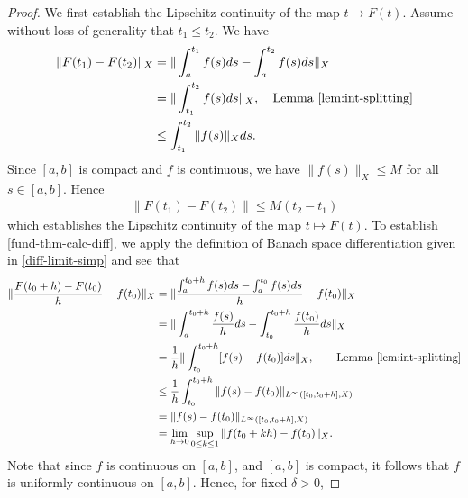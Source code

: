\documentclass[12pt,reqno]{amsart}
\numberwithin{equation}{section}  %
\numberwithin{figure}{section}
\theoremstyle{plain}
\theoremstyle{definition}
\theoremstyle{remark}
\begin{document}
\begin{proof}
We first establish the Lipschitz continuity of the map $t \mapsto F(t)$. Assume without
loss of generality that $t_{1} \le t_{2}$. We have
%
%
\begin{equation*}
\begin{split}
  \| F(t_{1}) - F(t_{2}) \|_{X}
  & = \| \int_{a}^{t_{1}}f(s)ds -
  \int_{a}^{t_{2}} f(s)ds \|_{X}
  \\
  & = \| \int_{t_{1}}^{t_{2}} f(s) ds \|_{X}, \quad \text{Lemma
  \ref{lem:int-splitting}}
  \\
  & \le \int_{t_{1}}^{t_{2}}\| f(s) \|_{X} ds.
\end{split}
\end{equation*}
%
%
Since $[a,b]$ is compact and $f$ is continuous, we have $\| f(s) \|_{X} \le M$
for all $s \in [a,b]$. Hence
%
%
\begin{equation*}
\begin{split}
  \| F(t_{1}) - F(t_{2}) \| \le M(t_{2} - t_{1})
\end{split}
\end{equation*}
%
%
which establishes the Lipschitz continuity of the map $t \mapsto F(t)$. To
establish \eqref{fund-thm-calc-diff}, we apply the definition of Banach space
differentiation given in \eqref{diff-limit-simp} and see that
%
%
\begin{equation*}
\begin{split}
   \| \frac{F(t_{0} + h) - F(t_{0})}{h}  - f(t_{0}) \|_{X}
  & = \| \frac{\int_{a}^{t_{0}+h}f(s)ds - \int_{a}^{t_{0}}f(s)ds}{h} -
  f(t_{0}) \|_{X}
  \\
  & = \| \int_{a}^{t_{0}+h}\frac{f(s)}{h}ds  -
  \int_{t_{0}}^{t_{0} + h} \frac{f(t_{0})}{h} ds \|_{X}
  \\
  & = \frac{1}{h} \| \int_{t_{0}}^{t_{0} + h}[f(s) - f(t_{0})]ds \|_{X}, \qquad
  \text{Lemma \ref{lem:int-splitting}}
  \\
  & \le \frac{1}{h} \int_{t_{0}}^{t_{0} + h} \| f(s) - f(t_{0})
  \|_{L^{\infty}\left( [t_{0}, t_{0} + h], X \right)}
  \\
  & = \| f(s) - f(t_{0})
  \|_{L^{\infty}\left( [t_{0}, t_{0} + h], X \right)}
  \\
  & = \lim_{h \to 0} \sup_{0 \le k \le 1} \| f(t_{0} + kh) - f(t_{0})
  \|_{X}.
\end{split}
\end{equation*}
%
%
Note that since $f$ is continuous on $[a,b]$, and $[a,b]$ is compact, it follows
that $f$ is uniformly continuous on $[a,b]$. Hence, for fixed $\delta > 0$,

\end{proof}
\end{document}

